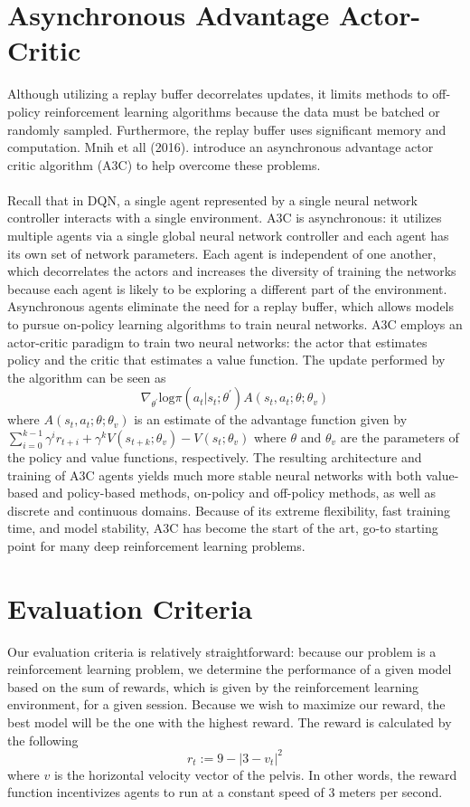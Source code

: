\documentclass[journal,onecolumn]{IEEEtran}
\begin{document}
\section{Asynchronous Advantage Actor-Critic}
Although utilizing a replay buffer decorrelates updates, it limits methods to off-policy reinforcement learning algorithms because the data must be batched or randomly sampled. Furthermore, the replay buffer uses significant memory and computation. Mnih et all (2016). introduce an asynchronous advantage actor critic algorithm (A3C) to help overcome these problems. \\\\
Recall that in DQN, a single agent represented by a single neural network controller interacts with a single environment. A3C is asynchronous: it utilizes multiple agents via a single global neural network controller and each agent has its own set of network parameters. Each agent is independent of one another, which decorrelates the actors and increases the diversity of training the networks because each agent is likely to be exploring a different part of the environment. Asynchronous agents eliminate the need for a replay buffer, which allows models to pursue on-policy learning algorithms to train neural networks. A3C employs an actor-critic paradigm to train two neural networks: the actor that estimates policy and the critic that estimates a value function. The update performed by the algorithm can be seen as
\[
\nabla_{\theta^{'}}\text{log}\pi(a_{t}|s_{t};\theta^{'})A(s_{t},a_{t};\theta;\theta_{v})
\]
where $A(s_{t},a_{t};\theta;\theta_{v})$ is an estimate of the advantage function given by $\sum_{i=0}^{k-1}\gamma^{i}r_{t+i}+\gamma^{k}V(s_{t+k};\theta_{v}) - V(s_{t};\theta_{v})$ where $\theta$ and $\theta_{v}$ are the parameters of the policy and value functions, respectively. The resulting architecture and training of A3C agents yields much more stable neural networks with both value-based and policy-based methods, on-policy and off-policy methods, as well as discrete and continuous domains. Because of its extreme flexibility, fast training time, and model stability, A3C has become the start of the art, go-to starting point for many deep reinforcement learning problems. 
\section{Evaluation Criteria}
Our evaluation criteria is relatively straightforward: because our problem is a reinforcement learning problem, we determine the performance of a given model based on the sum of rewards, which is given by the reinforcement learning environment, for a given session. Because we wish to maximize our reward, the best model will be the one with the highest reward. The reward is calculated by the following
\[
r_{t} := 9 - |3-v_{t}|^2
\]
where $v$ is the horizontal velocity vector of the pelvis. In other words, the reward function incentivizes agents to run at a constant speed of 3 meters per second. 
\end{document}

